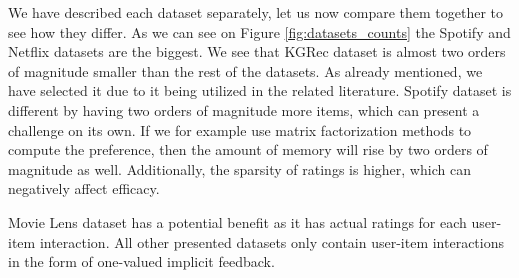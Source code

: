We have described each dataset separately, let us now compare them together to see how they differ. As we can see on Figure \ref{fig:datasets_counts} the Spotify and Netflix datasets are the biggest. We see that KGRec dataset is almost two orders of magnitude smaller than the rest of the datasets. As already mentioned, we have selected it due to it being utilized in the related literature. Spotify dataset is different by having two orders of magnitude more items, which can present a challenge on its own. If we for example use matrix factorization methods to compute the preference, then the amount of memory will rise by two orders of magnitude as well. Additionally, the sparsity of ratings is higher, which can negatively affect efficacy.

Movie Lens dataset has a potential benefit as it has actual ratings for each user-item interaction. All other presented datasets only contain user-item interactions in the form of one-valued implicit feedback.

